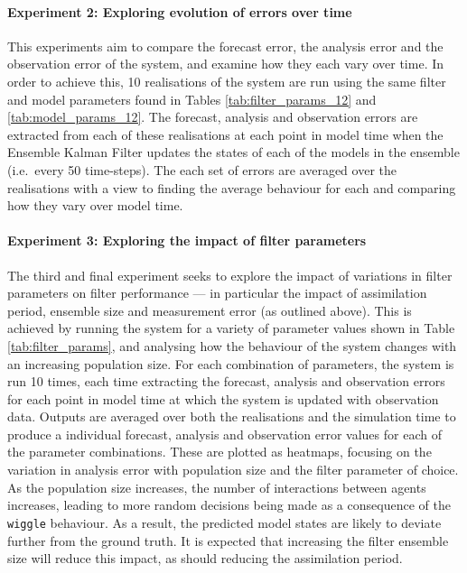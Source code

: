 \paragraph{Experiment 2: Exploring evolution of errors over time}

This experiments aim to compare the forecast error, the analysis error
and the observation error of the system, and examine how they each vary over
time.
In order to achieve this, 10 realisations of the system are run using the same
filter and model parameters found in Tables \ref{tab:filter_params_12} and
\ref{tab:model_params_12}.
The forecast, analysis and observation errors are extracted from each of these
realisations at each point in model time when the Ensemble Kalman Filter updates
the states of each of the models in the ensemble (i.e.\ every 50 time-steps).
The each set of errors are averaged over the realisations with a view to finding
the average behaviour for each and comparing how they vary over model time.

\paragraph{Experiment 3: Exploring the impact of filter parameters}

The third and final experiment seeks to explore the impact of variations in
filter parameters on filter performance --- in particular the impact of
assimilation period, ensemble size and measurement error (as outlined above).
This is achieved by running the system for a variety of parameter values shown
in Table \ref{tab:filter_params}, and analysing how the behaviour of the system
changes with an increasing population size.
For each combination of parameters, the system is run 10 times, each time
extracting the forecast, analysis and observation errors for each point in model
time at which the system is updated with observation data.
Outputs are averaged over both the realisations and the simulation time to
produce a individual forecast, analysis and observation error values for each of
the parameter combinations.
These are plotted as heatmaps, focusing on the variation in analysis error with
population size and the filter parameter of choice.
As the population size increases, the number of interactions between agents
increases, leading to more random decisions being made as a consequence of the
\texttt{wiggle} behaviour.
As a result, the predicted model states are likely to deviate further from the
ground truth.
It is expected that increasing the filter ensemble size will reduce this impact,
as should reducing the assimilation period.

